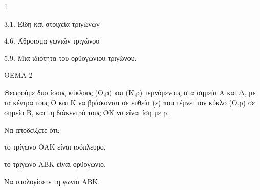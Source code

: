 \begin{ylh}{1}
    \item 3.1. Είδη και στοιχεία τριγώνων
    \item 4.6. Άθροισμα γωνιών τριγώνου
    \item 5.9. Μια ιδιότητα του ορθογώνιου τριγώνου.
\end{ylh}

ΘΕΜΑ 2

Θεωρούμε δυο ίσους κύκλους (Ο,ρ) και (Κ,ρ) τεμνόμενους στα σημεία Α και Δ, με τα κέντρα τους Ο και Κ να βρίσκονται σε ευθεία (ε) που τέμνει τον κύκλο (Ο,ρ) σε σημείο Β, και τη διάκεντρό τους ΟΚ να είναι ίση με ρ.

\begin{alist}
\item Να αποδείξετε ότι:

\begin{alist}
\item
  το τρίγωνο ΟΑΚ είναι ισόπλευρο, 
\item
  το τρίγωνο ΑΒΚ είναι ορθογώνιο. 

\item Να υπολογίσετε τη γωνία ΑΒΚ. 


\begin{center}
\end{center}
\end{alist}
\end{alist}
